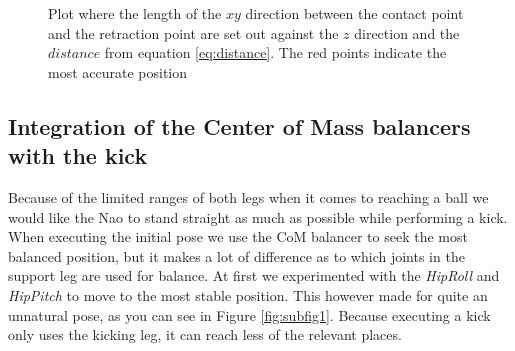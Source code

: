 \documentclass[a4paper]{article}
\begin{document}
\begin{figure}[htbp]
  \centering
  \caption{Plot where the length of the $xy$ direction between the contact point
      and the retraction point are set out against the $z$ direction and the $
      distance$ from equation \ref{eq:distance}. The red points indicate the
      most accurate position
         }
  \label{fig:retraction_plot3}
\end{figure}

\FloatBarrier

\subsection{Integration of the Center of Mass balancers with the kick}
Because of the limited ranges of both legs when it comes to reaching a ball we
would like the Nao to stand straight as much as possible while performing a kick. 
When executing the initial pose we use the CoM balancer to seek the most
balanced position, but it makes a lot of difference as to which joints in the
support leg are used for balance. At first we experimented  with the
\emph{HipRoll} and \emph{HipPitch} to move to the most stable position. This
however made for quite an unnatural pose, as you can see in Figure
\ref{fig:subfig1}. Because executing a kick only uses the kicking leg, it can
reach less of the relevant places. 
\end{document}
